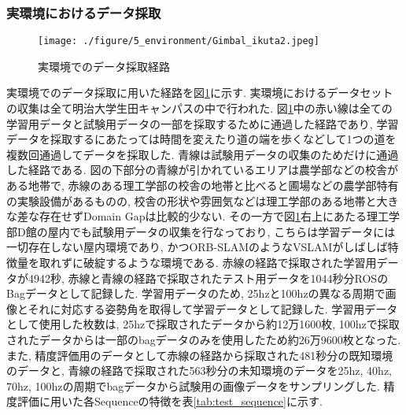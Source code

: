 \subsubsection{実環境におけるデータ採取}

\begin{figure}[thpb]
  \begin{minipage}[htpb]{1.0\hsize}
  \begin{center}
  \texttt{[image: ./figure/5\_environment/Gimbal\_ikuta2.jpeg]}
  \caption{実環境でのデータ採取経路}
  \label{fig:Gimbal_map}
  \end{center}
  \end{minipage}
\end{figure}

実環境でのデータ採取に用いた経路を図\ref{fig:Gimbal_map}に示す. 実環境におけるデータセットの収集は全て明治大学生田キャンパスの中で行われた. 図\ref{fig:Gimbal_map}中の赤い線は全ての学習用データと試験用データの一部を採取するために通過した経路であり, 学習データを採取するにあたっては時間を変えたり道の端を歩くなどして1つの道を複数回通過してデータを採取した. 青線は試験用データの収集のためだけに通過した経路である. 図の下部分の青線が引かれているエリアは農学部などの校舎がある地帯で, 赤線のある理工学部の校舎の地帯と比べると圃場などの農学部特有の実験設備があるものの, 校舎の形状や雰囲気などは理工学部のある地帯と大きな差な存在せずDomain Gap\cite{Domain_Adaptation_survey}は比較的少ない. その一方で図\ref{fig:Gimbal_map}右上にあたる理工学部D館の屋内でも試験用データの収集を行なっており, こちらは学習データには一切存在しない屋内環境であり, かつORB-SLAM\cite{ORB_SLAM}のようなVSLAMがしばしば特徴量を取れずに破綻するような環境である. 赤線の経路で採取された学習用データが4942秒, 赤線と青線の経路で採取されたテスト用データを1044秒分ROS\cite{ROS_paper}のBagデータとして記録した. 学習用データのため, 25hzと100hzの異なる周期で画像とそれに対応する姿勢角を取得して学習データとして記録した. 学習用データとして使用した枚数は, 25hzで採取されたデータから約12万1600枚, 100hzで採取されたデータからは一部のbagデータのみを使用したため約26万9600枚となった. また, 精度評価用のデータとして赤線の経路から採取された481秒分の既知環境のデータと, 青線の経路で採取された563秒分の未知環境のデータを25hz, 40hz, 70hz, 100hzの周期でbagデータから試験用の画像データをサンプリングした. 精度評価に用いた各Sequenceの特徴を表\ref{tab:test_sequence}に示す.


